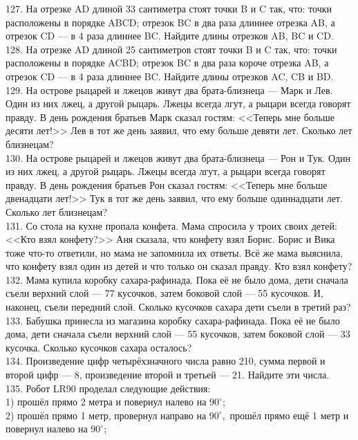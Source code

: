127. На отрезке AD длиной 33 сантиметра стоят точки B и C так, что: точки расположены в порядке ABCD; отрезок BC в два раза длиннее отрезка AB, а отрезок CD --- в 4 раза длиннее BC. Найдите длины отрезков AB, BC и CD.\\
128. На отрезке AD длиной 25 сантиметров стоят точки B и C так, что: точки расположены в порядке ACBD; отрезок BC в два раза короче отрезка AB, а отрезок CD --- в 4 раза длиннее BC. Найдите длины отрезков AC, CB и BD.\\
129. На острове рыцарей и лжецов живут два брата-близнеца --- Марк и Лев. Один из них лжец, а другой рыцарь. Лжецы всегда лгут, а рыцари всегда говорят правду. В день рождения братьев Марк сказал гостям: <<Теперь мне больше десяти лет!>> Лев в тот же день заявил, что ему больше девяти лет. Сколько лет близнецам?\\
130. На острове рыцарей и лжецов живут два брата-близнеца --- Рон и Тук. Один из них лжец, а другой рыцарь. Лжецы всегда лгут, а рыцари всегда говорят правду. В день рождения братьев Рон сказал гостям: <<Теперь мне больше двенадцати лет!>> Тук в тот же день заявил, что ему больше одиннадцати лет. Сколько лет близнецам?\\
131. Со стола на кухне пропала конфета. Мама спросила у троих своих детей: <<Кто взял конфету?>> Аня сказала, что конфету взял Борис. Борис и Вика тоже что-то ответили, но мама не запомнила их ответы. Всё же мама выяснила, что конфету взял один из детей и что только он сказал правду. Кто взял конфету?\\
132. Мама купила коробку сахара-рафинада. Пока её не было дома, дети сначала съели верхний слой --- 77 кусочков, затем боковой слой --- 55 кусочков. И, наконец, съели передний слой. Сколько кусочков сахара дети съели в третий раз?\\
133. Бабушка принесла из магазина коробку сахара-рафинада. Пока её не было дома, дети сначала съели верхний слой --- 55 кусочков, затем боковой слой --- 33 кусочка. Сколько кусочков сахара осталось?\\
134. Произведение цифр четырёхзначного числа равно 210, сумма первой и второй цифр --- 8, произведение второй и третьей --- 21. Найдите эти числа.\\
135. Робот LR90 проделал следующие действия:\\
1) прошёл прямо 2 метра и повернул налево на $90^\circ$;\\
2) прошёл прямо 1 метр, провернул направо на $90^\circ,$ прошёл прямо ещё 1 метр и повернул налево на $90^\circ$;\\
